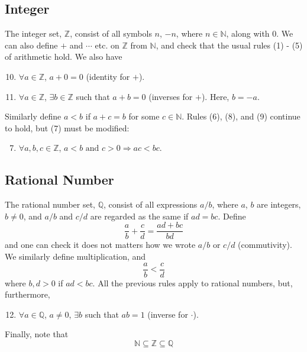 \documentclass[10pt, a4paper, twoside]{report}
\begin{document}
\subsection{Integer}
The integer set, \(\mathbb{Z}\), consist of all symbols \(n\), \(-n\), where \(n\in\mathbb{N}\), along with \(0\). We can also define \(+\) and \(\cdots\) etc. on \(\mathbb{Z}\) from \(\mathbb{N}\), and check that the usual rules (1) - (5) of arithmetic hold. We also have
\begin{enumerate}
    \setcounter{enumi}{9}
    \item \(\forall a\in\mathbb{Z}\), \(a+0=0\) \space (identity for \(+\)).
    \item \(\forall a\in\mathbb{Z}\), \(\exists b\in\mathbb{Z}\) such that \(a+b=0\) \space (inverses for \(+\)). Here, \(b=-a\).
\end{enumerate}
Similarly define \(a<b\) if \(a+c=b\) for some \(c\in\mathbb{N}\). Rules (6), (8), and (9) continue to hold, but (7) must be modified:
\begin{enumerate}
    \setcounter{enumi}{6}
    \item \(\forall a,b,c\in\mathbb{Z}\), \(a<b\text{  and  }c>0\Rightarrow ac<bc\).
\end{enumerate}
\subsection{Rational Number}
The rational number set, \(\mathbb{Q}\), consist of all expressions \(a/b\), where \(a\), \(b\) are integers, \(b\neq 0\), and \(a/b\) and \(c/d\) are regarded as the same if \(ad=bc\). Define 
\[\frac ab+\frac cd=\frac{ad+bc}{bd}\]
and one can check it does not matters how we wrote \(a/b\) or \(c/d\) (commutivity). We similarly define multiplication, and
\[\frac ab<\frac cd\]
where \(b,d>0\) if \(ad<bc\). All the previous rules apply to rational numbers, but, furthermore,
\begin{enumerate}
    \setcounter{enumi}{11}
    \item \(\forall a\in\mathbb{Q}\), \(a\neq 0\), \(\exists b\) such that \(ab=1\) \space (inverse for \(\cdot\)).
\end{enumerate}
Finally, note that
\[\mathbb{N}\subseteq\mathbb{Z}\subseteq\mathbb{Q}\]
\end{document}

